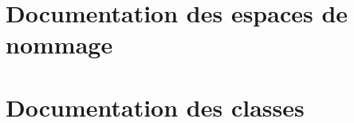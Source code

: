 \documentclass[twoside]{article}
\newcommand{\+}{\discretionary{\mbox{\scriptsize$\hookleftarrow$}}{}{}}
\begin{document}
\section{Documentation des espaces de nommage}

\section{Documentation des classes}
































\end{document}
